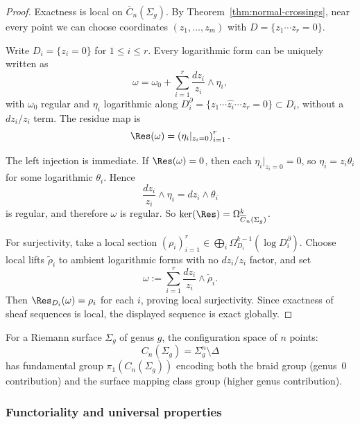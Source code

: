 \begin{proof}
Exactness is local on $\overline{C}_n(\Sigma_g)$. By
Theorem~\ref{thm:normal-crossings}, near every point we can choose coordinates
$(z_1,\dots,z_m)$ with $D=\{z_1\cdots z_r=0\}$.

Write $D_i=\{z_i=0\}$ for $1\le i\le r$. Every logarithmic form can be uniquely
written as
\[
\omega=\omega_0+\sum_{i=1}^r \frac{dz_i}{z_i}\wedge\eta_i,
\]
with $\omega_0$ regular and $\eta_i$ logarithmic along
$D_i^\partial=\{z_1\cdots \widehat{z_i}\cdots z_r=0\}\subset D_i$, without a
$dz_i/z_i$ term. The residue map is
\[
\Res(\omega)=\left(\eta_i|_{z_i=0}\right)_{i=1}^r.
\]

The left injection is immediate. If $\Res(\omega)=0$, then each
$\eta_i|_{z_i=0}=0$, so $\eta_i=z_i\theta_i$ for some logarithmic $\theta_i$.
Hence
\[
\frac{dz_i}{z_i}\wedge \eta_i = dz_i\wedge\theta_i
\]
is regular, and therefore $\omega$ is regular. So
$\ker(\Res)=\Omega^k_{\overline{C}_n(\Sigma_g)}$.

For surjectivity, take a local section
$(\rho_i)_{i=1}^r\in\bigoplus_i\Omega^{k-1}_{D_i}(\log D_i^\partial)$.
Choose local lifts $\widetilde{\rho}_i$ to ambient logarithmic forms with no
$dz_i/z_i$ factor, and set
\[
\omega:=\sum_{i=1}^r \frac{dz_i}{z_i}\wedge \widetilde{\rho}_i.
\]
Then $\Res_{D_i}(\omega)=\rho_i$ for each $i$, proving local surjectivity. Since
exactness of sheaf sequences is local, the displayed sequence is exact globally.
\end{proof}

For a Riemann surface $\Sigma_g$ of genus $g$, the configuration space of $n$ points:
\[C_n(\Sigma_g) = \Sigma_g^n \setminus \Delta\]
has fundamental group $\pi_1(C_n(\Sigma_g))$ encoding both the braid group (genus~$0$ contribution) and the surface mapping class group (higher genus contribution).

\subsubsection{Functoriality and universal properties}

